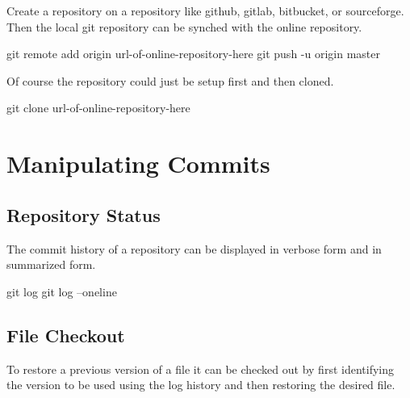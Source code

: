 \documentclass[]{book}
\newenvironment{Shaded}{\begin{snugshade}}{\end{snugshade}}
\newcommand{\FunctionTok}[1]{\textcolor[rgb]{0.00,0.00,0.00}{#1}}
\newcommand{\NormalTok}[1]{#1}
\begin{document}
Create a repository on a repository like github, gitlab, bitbucket, or sourceforge. Then the local git repository can be synched with the online repository.

\begin{Shaded}
\begin{Highlighting}[]
\FunctionTok{git}\NormalTok{ remote add origin url-of-online-repository-here}
\FunctionTok{git}\NormalTok{ push -u origin master}
\end{Highlighting}
\end{Shaded}

Of course the repository could just be setup first and then cloned.

\begin{Shaded}
\begin{Highlighting}[]
\FunctionTok{git}\NormalTok{ clone url-of-online-repository-here}
\end{Highlighting}
\end{Shaded}

\hypertarget{manipulating-commits}{%
\section{Manipulating Commits}\label{manipulating-commits}}

\hypertarget{repository-status}{%
\subsection{Repository Status}\label{repository-status}}

The commit history of a repository can be displayed in verbose form and in summarized form.

\begin{Shaded}
\begin{Highlighting}[]
\FunctionTok{git}\NormalTok{ log}
\FunctionTok{git}\NormalTok{ log --oneline}
\end{Highlighting}
\end{Shaded}

\hypertarget{file-checkout}{%
\subsection{File Checkout}\label{file-checkout}}

To restore a previous version of a file it can be checked out by first identifying the version to be used using the log history and then restoring the desired file.
\end{document}
